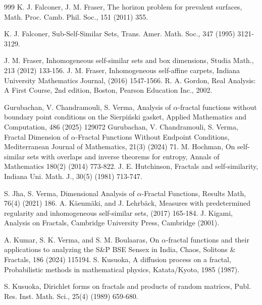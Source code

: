 \documentclass[12pt,oneside,reqno]{amsart}
\theoremstyle{definition}
\theoremstyle{remark}
\begin{document}
\begin{thebibliography}{999}
 K. J. Falconer, J. M. Fraser, The horizon problem for prevalent surfaces, Math. Proc. Camb. Phil. Soc., 151 (2011) 355.

  K. J. Falconer, Sub-Self-Similar Sets, Trans. Amer. Math. Soc., 347 (1995) 3121-3129.

 J. M. Fraser, Inhomogeneous self-similar sets and box dimensions, Studia Math., 213 (2012) 133-156.
 J. M. Fraser, Inhomogeneous self-affine carpets, Indiana University Mathematics Journal, (2016) 1547-1566.
 R. A. Gordon, Real Analysis: A First Course, 2nd edition, Boston, Pearson Education Inc.,
2002. 

 Gurubachan, V. Chandramouli, S. Verma, Analysis of $\alpha$-fractal functions without boundary point conditions on the Sierpi\'nski gasket, Applied Mathematics and Computation, 486 (2025) 129072
 Gurubachan, V. Chandramouli, S. Verma, Fractal Dimension of $\alpha$-Fractal Functions Without Endpoint Conditions, Mediterranean Journal of Mathematics, 21(3) (2024) 71.
 M. Hochman, On self-similar sets with overlaps and inverse theorems for entropy, Annals of Mathematics 180(2) (2014) 773-822.	
 J. E. Hutchinson, Fractals and self-similarity, Indiana Uni. Math. J., 30(5) (1981) 713-747.


 S. Jha, S. Verma, Dimensional Analysis of $\alpha$-Fractal Functions, Results Math, 76(4) (2021) 186.
 A. K\"{a}enm\"{a}ki, and J. Lehrb\"{a}ck, Measures with predetermined regularity and inhomogeneous self-similar sets, (2017) 165-184.
  J. Kigami, Analysis on Fractals, Cambridge University Press, Cambridge (2001).

 A. Kumar, S. K. Verma, and S. M. Boulaaras, On $\alpha$-fractal functions and their applications to analyzing the S\&P BSE Sensex in India, Chaos, Solitons \& Fractals, 186 (2024) 115194.
 S. Kusuoka, A diffusion process on a fractal, Probabilistic methods in mathematical physics, Katata/Kyoto, 1985 (1987).

 S. Kusuoka, Dirichlet forms on fractals and products of random matrices, Publ. Res. Inst. Math. Sci., 25(4) (1989) 659-680.


\end{thebibliography}
\end{document}
